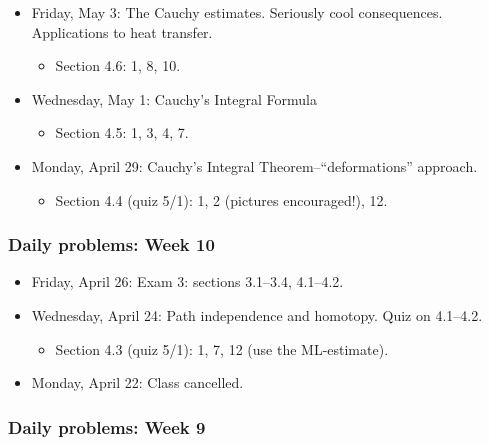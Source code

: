 \begin{itemize}
\item Friday, May 3: The Cauchy estimates. Seriously cool consequences. Applications to heat transfer.

\begin{itemize}
\item Section 4.6: 1, 8, 10.

\end{itemize}

\item Wednesday, May 1: Cauchy's Integral Formula

\begin{itemize}
\item Section 4.5: 1, 3, 4, 7.

\end{itemize}

\item Monday, April 29: Cauchy's Integral Theorem--``deformations'' approach.

\begin{itemize}
\item Section 4.4 (quiz 5\slash 1): 1, 2 (pictures encouraged!), 12.

\end{itemize}

\end{itemize}

\subsubsection{Daily problems: Week 10}
\label{dailyproblems:week10}

\begin{itemize}
\item Friday, April 26: Exam 3: sections 3.1--3.4, 4.1--4.2.

\item Wednesday, April 24: Path independence and homotopy. Quiz on 4.1--4.2.

\begin{itemize}
\item Section 4.3 (quiz 5\slash 1): 1, 7, 12 (use the ML-estimate).

\end{itemize}

\item Monday, April 22: Class cancelled.

\end{itemize}

\subsubsection{Daily problems: Week 9}
\label{dailyproblems:week9}

